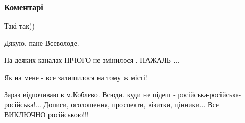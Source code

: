  
 
 
 
 
\subsubsection{Коментарі}

\begin{itemize}
 
Такі-так))

 
Дякую, пане Всеволоде.

 
На деяких каналах НІЧОГО не змінилося .
НАЖАЛЬ ...

 

Як на мене - все залишилося на тому ж місті!

Зараз відпочиваю в м.Коблєво. Всюди, куди не підеш -
російська-російська-російська!... Дописи, оголошення, проспекти, візитки,
цінники... Все ВИКЛЮЧНО російською!!!

 

\end{itemize}
